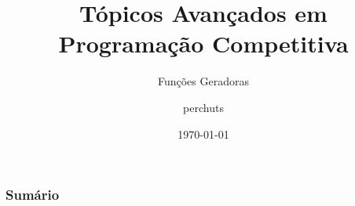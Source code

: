 \documentclass{beamer}
\title{Tópicos Avançados em Programação Competitiva}
\subtitle{Funções Geradoras}
\author{perchuts}
\institute{UFMG}
\date{\today}
\begin{document}
\frame{\titlepage}

\begin{frame}
\frametitle{Sumário}
\tableofcontents
\end{frame}

\end{document}
